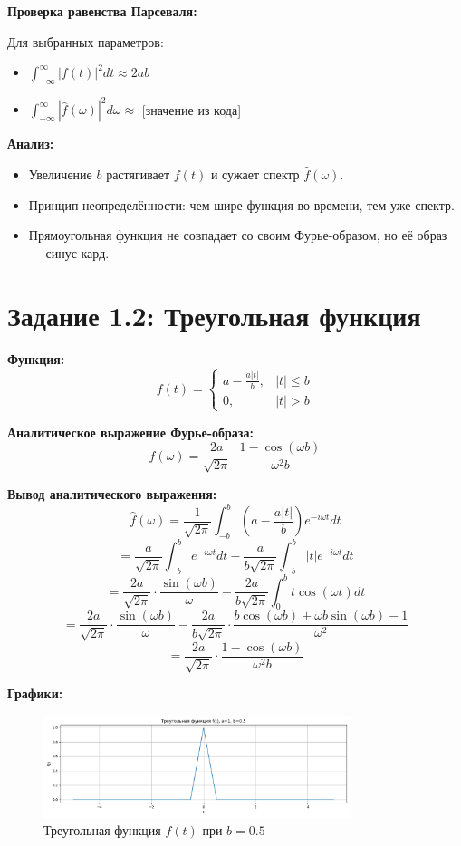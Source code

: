 \textbf{Проверка равенства Парсеваля:}

Для выбранных параметров:
\begin{itemize}
    \item $\displaystyle \int_{-\infty}^{\infty} |f(t)|^2 dt \approx 2ab$
    \item $\displaystyle \int_{-\infty}^{\infty} |\hat{f}(\omega)|^2 d\omega \approx$ [значение из кода]
\end{itemize}

\textbf{Анализ:}

\begin{itemize}
    \item Увеличение $b$ растягивает $f(t)$ и сужает спектр $\hat{f}(\omega)$.
    \item Принцип неопределённости: чем шире функция во времени, тем уже спектр.
    \item Прямоугольная функция не совпадает со своим Фурье-образом, но её образ — синус-кард.
\end{itemize}


\section*{Задание 1.2: Треугольная функция}

\textbf{Функция:}
\[
f(t) = 
\begin{cases}
a - \frac{a |t|}{b}, & |t| \le b \\
0, & |t| > b
\end{cases}
\]

\textbf{Аналитическое выражение Фурье-образа:}
\[
\hat{f}(\omega) = \frac{2a}{\sqrt{2\pi}} \cdot \frac{1 - \cos(\omega b)}{\omega^2 b}
\]

\textbf{Вывод аналитического выражения:}
\[
\hat{f}(\omega) = \frac{1}{\sqrt{2\pi}} \int_{-b}^{b} \left(a - \frac{a |t|}{b}\right) e^{-i \omega t} dt
\]
\[
= \frac{a}{\sqrt{2\pi}} \int_{-b}^{b} e^{-i \omega t} dt - \frac{a}{b\sqrt{2\pi}} \int_{-b}^{b} |t| e^{-i \omega t} dt
\]
\[
= \frac{2a}{\sqrt{2\pi}} \cdot \frac{\sin(\omega b)}{\omega} - \frac{2a}{b\sqrt{2\pi}} \int_{0}^{b} t \cos(\omega t) dt
\]
\[
= \frac{2a}{\sqrt{2\pi}} \cdot \frac{\sin(\omega b)}{\omega} - \frac{2a}{b\sqrt{2\pi}} \cdot \frac{b \cos(\omega b) + \omega b \sin(\omega b) - 1}{\omega^2}
\]
\[
= \frac{2a}{\sqrt{2\pi}} \cdot \frac{1 - \cos(\omega b)}{\omega^2 b}
\]

\textbf{Графики:}

\begin{figure}[H]
    \centering
    \includegraphics[width=0.8\textwidth]{triangle_function_b0.5.png}
    \caption{Треугольная функция $f(t)$ при $b = 0.5$}
\end{figure}

